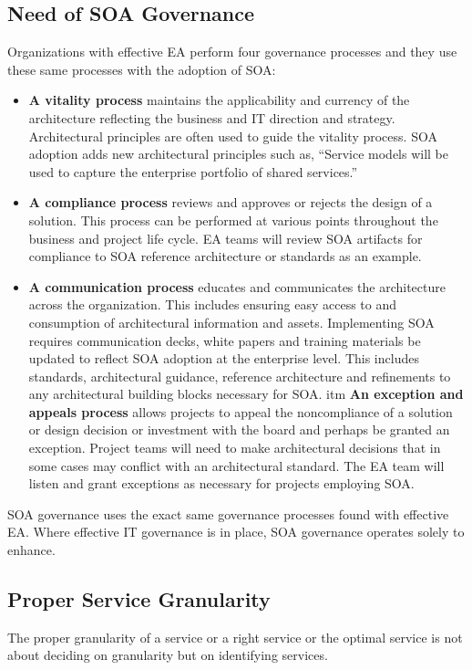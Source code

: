 \documentclass[12pt,a4paper,final,twoside,onecolumn,titlepage]{book}
\begin{document}
\subsection{Need of SOA Governance}
Organizations with effective \gls{EA} perform four governance processes and they use these same processes with the adoption of \gls{SOA}:
\begin{itemize}
\item \textbf{A vitality process} maintains the applicability and currency of the architecture reflecting the business and IT direction and strategy. Architectural principles are often used to guide the vitality process. \gls{SOA} adoption adds new architectural principles such as, “Service models will be used to capture the enterprise portfolio of shared services.”
\item \textbf{A compliance process} reviews and approves or rejects the design of a solution. This process can be performed at various points throughout the business and project life cycle. \gls{EA} teams will review \gls{SOA} artifacts for compliance to \gls{SOA} reference architecture or standards as an example.
\item \textbf{A communication process} educates and communicates the architecture across the organization. This includes ensuring easy access to and consumption of architectural information and assets. Implementing \gls{SOA} requires communication decks, white papers and training materials be updated to reflect \gls{SOA} adoption at the enterprise level. This includes standards, architectural guidance, reference architecture and refinements to any architectural building blocks necessary for \gls{SOA}.
itm \textbf{An exception and appeals process} allows projects to appeal the noncompliance of a solution or design decision or investment with the board and perhaps be granted an exception. Project teams will need to make architectural decisions that in some cases may conflict with an architectural standard. The EA team will listen and grant exceptions as necessary for projects employing \gls{SOA}. 
\end{itemize}
\gls{SOA} governance uses the exact same governance processes found with effective \gls{EA}. Where effective IT governance is in place, \gls{SOA} governance operates solely to enhance. 
\subsection{Proper Service Granularity}
The proper granularity of a service or a right service or the optimal service is not about deciding on granularity but on identifying services.
\end{document}
